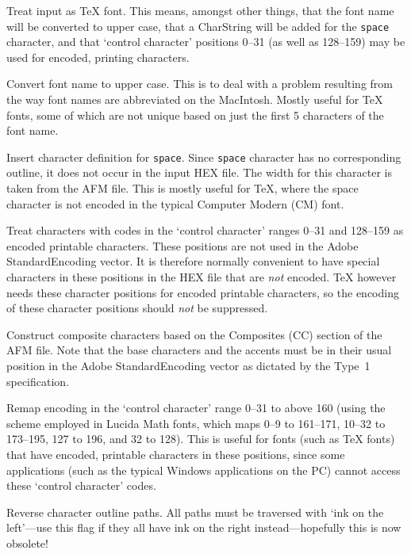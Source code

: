  Treat input as {\TeX} font.  This means, amongst other
things, that the font name will be converted to upper case, that a
CharString will be added for the {\tt space} character,
and that `control character' positions 0--31 (as well as 128--159) 
may be used for encoded, printing characters.

 Convert font name to upper case.  This is to deal with a
problem resulting from the way font names are abbreviated on the MacIntosh.
Mostly useful for {\TeX} fonts, some of which are not unique based on
just the first 5 characters of the font name.

 Insert character definition for {\tt space}.  
Since {\tt space} character has no corresponding outline, it does not occur
in the input HEX file. The width for this character is taken from the
AFM file.  This is mostly useful for {\TeX}, where the space
character is not encoded in the typical Computer Modern (CM) font.

 Treat characters with codes in the `control character'
ranges 0--31 and 128--159 as encoded printable characters.  
These positions are not used in the Adobe StandardEncoding vector.
It is therefore normally convenient to have special characters
in these positions in the HEX file that are {\it not} encoded.
{\TeX} however needs these character positions for encoded printable
characters, so the encoding of these character positions should {\it not} 
be suppressed.

 Construct composite characters based on the 
Composites (CC) section of the AFM file.  Note that the base
characters and the accents must be in their usual position in the
Adobe StandardEncoding vector as dictated by the Type~1 specification.

 Remap encoding in the `control character' range 0--31 to
above 160
(using the scheme employed in Lucida Math fonts, which maps
0--9 to 161--171, 10--32 to 173--195, 127 to 196, and 32 to 128).
This is useful for fonts (such as {\TeX} fonts) that have encoded,
printable characters in these positions, since some applications (such
as the typical Windows applications on the PC) cannot access these
`control character' codes.  

 Reverse character outline paths. All paths must be
traversed with `ink on the left'---use this flag if they all have ink
on the right instead---hopefully this is now obsolete!

